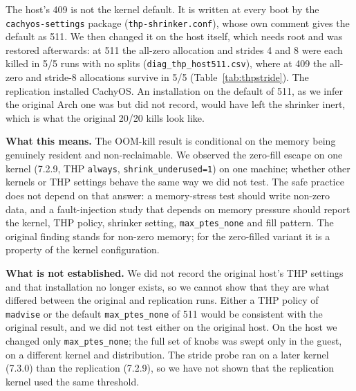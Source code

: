 \documentclass[conference]{IEEEtran}
\begin{document}
The host's 409 is not the kernel default. It is written at every boot by the
\texttt{cachyos-settings} package (\texttt{thp-shrinker.conf}), whose own comment gives
the default as 511. We then changed it on the host itself, which needs root and was
restored afterwards: at 511 the all-zero allocation and strides 4 and 8 were each killed in
5/5 runs with no splits (\texttt{diag\_thp\_host511.csv}), where at 409 the all-zero and
stride-8 allocations survive in 5/5 (Table~\ref{tab:thpstride}). The replication installed
CachyOS. An installation on the default of 511, as we infer the original Arch one was but
did not record, would have left the shrinker inert, which is what the original 20/20 kills
look like.

\textbf{What this means.} The OOM-kill result is conditional on the memory being
genuinely resident and non-reclaimable. We observed the zero-fill escape on one kernel
(7.2.9, THP \texttt{always}, \texttt{shrink\_underused=1}) on one machine; whether other
kernels or THP settings behave the same way we did not test. The safe practice does not
depend on that answer: a memory-stress test should write non-zero data, and a
fault-injection study that depends on memory pressure should report the kernel, THP
policy, shrinker setting, \texttt{max\_ptes\_none} and fill pattern. The original finding stands for non-zero memory; for the
zero-filled variant it is a property of the kernel configuration.

\textbf{What is not established.} We did not record the original host's THP settings
and that installation no longer exists, so we cannot show that they are what differed
between the original and replication runs. Either a THP policy of \texttt{madvise} or the
default \texttt{max\_ptes\_none} of 511 would be consistent with the original result, and
we did not test either on the original host. On the host we changed only
\texttt{max\_ptes\_none}; the full set of knobs was swept only in the guest, on a different
kernel and distribution. The stride probe ran on a later kernel (7.3.0) than the
replication (7.2.9), so we have not shown that the replication kernel used the same
threshold.
\end{document}
